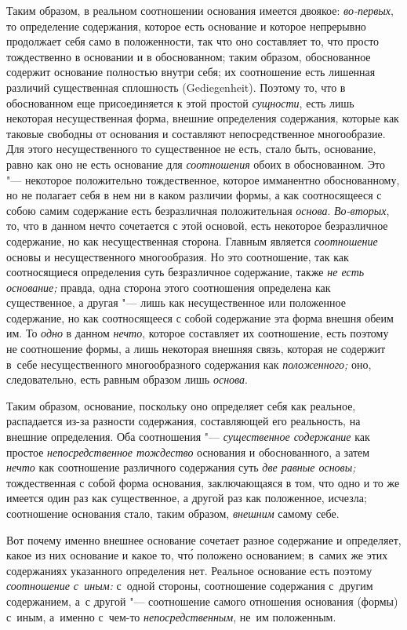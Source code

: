 Таким образом, в реальном соотношении основания имеется двоякое:
{\em во-первых}, то определение содержания, которое есть основание и которое
непрерывно продолжает себя само в положенности, так что оно составляет то, что
просто тождественно в основании и в обоснованном; таким образом, обоснованное
содержит основание полностью внутри себя; их соотношение есть лишенная различий
существенная сплошность (Gedie\-gen\-heit). Поэтому то, что в обоснованном еще
присоединяется к этой простой {\em сущности}, есть лишь некоторая
несущественная форма, внешние определения содержания, которые как таковые
свободны от основания и составляют непосредственное многообразие. Для этого
несущественного то существенное не есть, стало быть, основание, равно как оно
не есть основание для {\em соотношения} обоих в обоснованном. Это "---
некоторое положительно тождественное, которое имманентно обоснованному, но не
полагает себя в нем ни в каком различии формы, а как соотносящееся с собою
самим содержание есть безразличная положительная {\em основа}. {\em Во-вторых},
то, что в данном нечто сочетается с этой основой, есть некоторое безразличное
содержание, но как несущественная сторона. Главным является {\em соотношение}
основы и несущественного многообразия. Но это соотношение, так как
соотносящиеся определения суть безразличное содержание, также {\em не есть
основание;} правда, одна сторона этого соотношения определена как существенное,
а другая "--- лишь как несущественное или положенное содержание, но как
соотносящееся с собой содержание эта форма внешня обеим им. То {\em одно}
в данном {\em нечто}, которое составляет их соотношение, есть поэтому не
соотношение формы, а лишь некоторая внешняя связь, которая не содержит в~себе
несущественного многообразного содержания как {\em положенного;} оно,
следовательно, есть равным образом лишь {\em основа}.

Таким образом, основание, поскольку оно определяет себя как реальное,
распадается из-за разности содержания, составляющей его реальность, на внешние
определения. Оба соотношения "--- {\em существенное содержание} как простое
{\em непосредственное тождество} основания и обоснованного, а затем {\em нечто}
как соотношение различного содержания суть {\em две равные основы;}
тождественная с собой форма основания, заключающаяся в том, что одно и то же
имеется один раз как существенное, а другой раз как положенное, исчезла;
соотношение основания стало, таким образом, {\em внешним} самому себе.

Вот почему именно внешнее основание сочетает разное содержание и определяет,
какое из них основание и какое то, чт\'{о} положено основанием; в~самих же
этих содержаниях указанного определения нет. Реальное основание есть поэтому
{\em соотношение с~иным:} с~одной стороны, соотношение содержания с~другим
содержанием, а~с другой "--- соотношение самого отношения основания (формы)
с~иным, а~именно с~чем-то {\em непосредственным}, не~им положенным.

